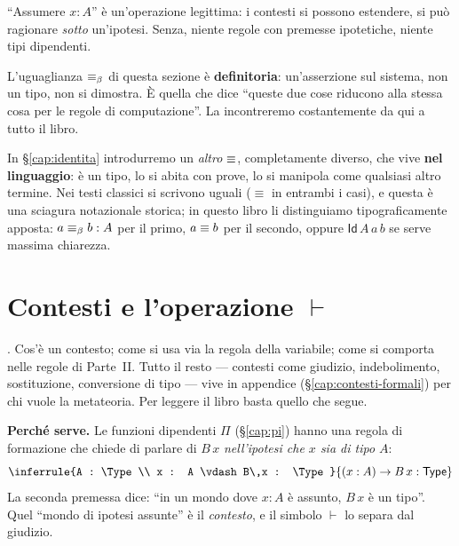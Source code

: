 \begin{cero}\label{cero:contesti}
``Assumere $x : A$'' \`e un'operazione legittima: i contesti si possono estendere, si pu\`o ragionare \emph{sotto} un'ipotesi. Senza, niente regole con premesse ipotetiche, niente tipi dipendenti.
\end{cero}

\begin{oss}
L'uguaglianza $\equiv_{\beta}$ di questa sezione \`e \textbf{definitoria}: un'asserzione sul sistema, non un tipo, non si dimostra. \`E quella che dice ``queste due cose riducono alla stessa cosa per le regole di computazione''. La incontreremo costantemente da qui a tutto il libro.

In \S\ref{cap:identita} introdurremo un \emph{altro} $\equiv$, completamente diverso, che vive \textbf{nel linguaggio}: \`e un tipo, lo si abita con prove, lo si manipola come qualsiasi altro termine. Nei testi classici si scrivono uguali ($\equiv$ in entrambi i casi), e questa \`e una sciagura notazionale storica; in questo libro li distinguiamo tipograficamente apposta: $a \equiv_{\beta} b : A$ per il primo, $a \equiv b$ per il secondo, oppure $\mathsf{Id}\, A\, a\, b$ se serve massima chiarezza.
\end{oss}

\chapter{Contesti e l'operazione $\vdash$}\label{cap:contesti}

. Cos'\`e un contesto; come si usa via la regola della variabile; come si comporta nelle regole di Parte~II. Tutto il resto --- contesti come giudizio, indebolimento, sostituzione, conversione di tipo --- vive in appendice (\S\ref{cap:contesti-formali}) per chi vuole la metateoria. Per leggere il libro basta quello che segue.

\bigskip

\noindent\textbf{Perch\'e serve.} Le funzioni dipendenti $\Pi$ (\S\ref{cap:pi}) hanno una regola di formazione che chiede di parlare di $B\,x$ \emph{nell'ipotesi che $x$ sia di tipo $A$}:
\[
\inferrule{A : \Type \\ x : A \vdash B\,x : \Type}{(x : A) \to B\,x : \Type}
\]
La seconda premessa dice: ``in un mondo dove $x : A$ \`e assunto, $B\,x$ \`e un tipo''. Quel ``mondo di ipotesi assunte'' \`e il \emph{contesto}, e il simbolo $\vdash$ lo separa dal giudizio.

